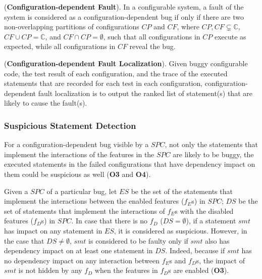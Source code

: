 %

\begin{Definition}{({\bf Configuration-dependent Fault}).}
In a configurable system, a fault of the system is considered as a
configuration-dependent bug if only if there are two non-overlapping
partitions of configurations $CP$ and $CF$, where $CP, CF \subsetneq
\mathbb{C}$, $CF \cup CP = \mathbb{C}$, and $CF \cap CP = \emptyset$,
such that all configurations in $CP$ execute as expected, while all
configurations in $CF$ reveal the bug.
\end{Definition}

\begin{Definition}{({\bf Configuration-dependent Fault Localization}).}
Given buggy configurable code, the test result of each configuration,
and the trace of the executed statements that are recorded for each
test in each configuration, configuration-dependent fault localization
is to output the ranked list of statement(s) that are likely to cause
the fault(s).
\end{Definition}





\subsubsection{Suspicious Statement Detection}
\label{statement_detection_section}

For a configuration-dependent bug visible by a $SPC$, not only the 
statements that implement the interactions of the features in the 
$SPC$ are likely to be buggy, the executed statements in the failed 
configurations that have dependency impact on them could be suspicious 
as well ({\bf O3} and {\bf O4}).
%

Given a $SPC$ of a particular bug, let $ES$ be the set of the statements
that implement the interactions between the enabled features ($f_E$s)
in $SPC$; $DS$ be the set of statements that implement the
interactions of $f_E$s with the disabled features ($f_D$s) in $SPC$.
%
In case that there is no $f_D$ ($DS=\emptyset$), if a statement $smt$
has impact on any statement in $ES$, it is considered as
suspicious. However, in the case that $DS \neq \emptyset$, $smt$ is
considered to be faulty only if $smt$ also has dependency impact on at
least one statement in $DS$. Indeed, because if $smt$ has no
dependency impact on any interaction between $f_E$s and $f_D$s, the
impact of $smt$ is not hidden by any $f_D$ when the features in $f_D$s
are enabled ({\bf O3}).

